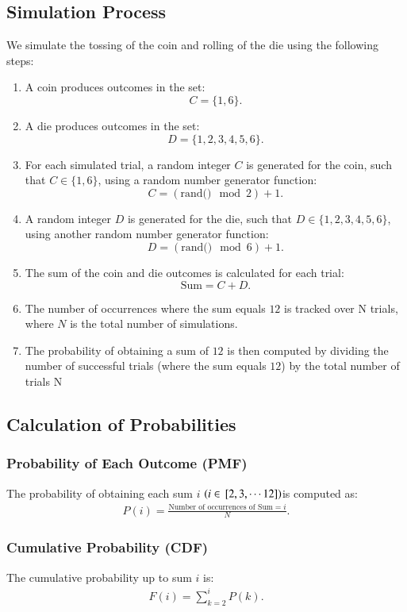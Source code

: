 \documentclass[journal]{IEEEtran}
\begin{document}
\subsection*{Simulation Process}
We simulate the tossing of the coin and rolling of the die using the following steps:
\begin{enumerate}
    \item A coin produces outcomes in the set:
    \[
    C = \{1, 6\}.
    \]
    \item A die produces outcomes in the set:
    \[
    D = \{1, 2, 3, 4, 5, 6\}.
    \]
    \item For each simulated trial, a random integer \( C \) is generated for the coin, such that \( C \in \{1, 6\} \), using a random number generator function:
    \[
    C = (\text{rand()} \mod 2) + 1.
    \]
    \item A random integer \( D \) is generated for the die, such that \( D \in \{1, 2, 3, 4, 5, 6\} \), using another random number generator function:
    \[
    D = (\text{rand()} \mod 6) + 1.
    \]
    \item The sum of the coin and die outcomes is calculated for each trial:
    \[
    \text{Sum} = C + D.
    \]
    \item The number of occurrences where the sum equals $12$ is tracked over N trials, where \( N \) is the total number of simulations.
    \item The probability of obtaining a sum of $12$ is then computed by dividing the number of successful trials (where the sum equals $12$) by the total number of trials N
\end{enumerate}

\subsection*{Calculation of Probabilities}
\subsubsection*{Probability of Each Outcome (PMF)}
The probability of obtaining each sum $i$ $\left(i \in {}\left[2,3, \cdots 12\right]\right)$is computed as:
\begin{align}
    P(i) = \frac{\text{Number of occurrences of Sum} = i}{N}.
\end{align}

\subsubsection*{Cumulative Probability (CDF)}
The cumulative probability up to sum $i$ is:
\begin{align}
    F(i) = \sum_{k=2}^{i} P(k).
\end{align}
\end{document}
